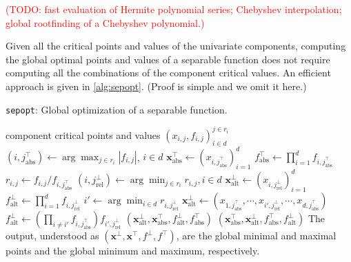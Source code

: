 \documentclass{article}
\newcommand{\todo}[1]{\textcolor{red}{(#1)}}
\begin{document}
\todo{TODO: fast evaluation of Hermite polynomial series; Chebyshev
interpolation; global rootfinding of a Chebyshev polynomial.}

Given all the critical points and values of the univariate components,
computing the global optimal points and values of a separable function
does not require computing all the combinations of the component
critical values. An efficient approach is given in \cref{alg:sepopt}. (Proof is
simple and we omit it here.)

\begin{algorithm}[h]
  \caption{\texttt{sepopt}: Global optimization of a separable function.}
  \label{alg:sepopt}
  \begin{algorithmic}[1] %
    \Input component critical points and values $(x_{i,j}, f_{i,j})_{i \in d}^{j \in r_i}$
    \State $(i, j^\top_{\mathrm{abs}}) \gets \arg\max_{j \in r_i} |f_{i,j}|$, $i \in d$
    \State $\mathbf{x}_{\mathrm{abs}}^\top \gets (x_{i, j^\top_{\mathrm{abs}}})_{i=1}^d$
    \State $f_{\mathrm{abs}}^\top \gets \prod_{i=1}^d f_{i, j^\top_{\mathrm{abs}}}$
    \State $r_{i,j} \gets f_{i,j} / f_{i, j^\top_{\mathrm{abs}}}$
    \State $(i, j^\bot_{\mathrm{rel}}) \gets \arg\min_{j \in r_i} r_{i,j}, i \in d$
    \State $\mathbf{x}_{\mathrm{alt}}^\bot \gets (x_{i, j^\bot_{\mathrm{rel}}})_{i=1}^d$
    \State $f_{\mathrm{alt}}^\bot \gets \prod_{i=1}^d f_{i, j^\bot_{\mathrm{rel}}}$
    \Else
    \State $i' \gets \arg\min_{i \in d} r_{i, j^\bot_{\mathrm{rel}}}$
    \State $\mathbf{x}_{\mathrm{alt}}^\bot \gets (x_{1, j^\top_{\mathrm{abs}}}, \cdots,
    x_{i', j^\bot_{\mathrm{rel}}}, \cdots, x_{d, j^\top_{\mathrm{abs}}})$
    \State $f_{\mathrm{alt}}^\bot \gets (\prod_{i \ne i'} f_{i, j^\top_{\mathrm{abs}}})
    f_{i', j^\bot_{\mathrm{rel}}}$
    \EndIf
    \State \Return $(\mathbf{x}_{\mathrm{alt}}^\bot, \mathbf{x}_{\mathrm{abs}}^\top,
    f_{\mathrm{alt}}^\bot, f_{\mathrm{abs}}^\top)$
    \Else
    \State \Return $(\mathbf{x}_{\mathrm{abs}}^\top, \mathbf{x}_{\mathrm{alt}}^\bot,
    f_{\mathrm{abs}}^\top, f_{\mathrm{alt}}^\bot)$
    \EndIf
    \Note The output, understood as $(\mathbf{x}^\bot, \mathbf{x}^\top, f^\bot, f^\top)$,
  are the global minimal and maximal points and the global minimum and maximum, respectively.
  \end{algorithmic}
\end{algorithm}
\end{document}
